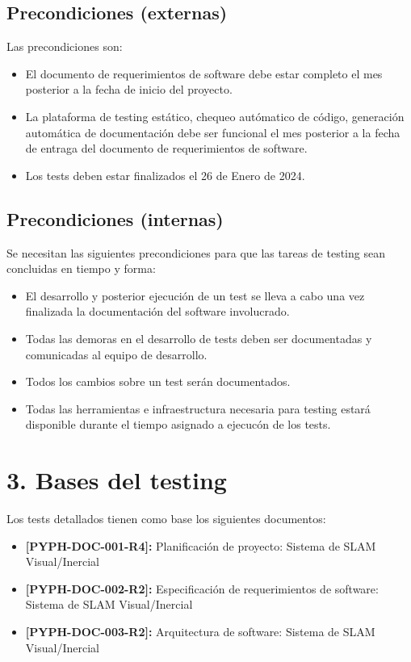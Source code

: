 \documentclass[
11pt, %
codirector, %
]{simple_charter}
\begin{document}
\subsection{Precondiciones (externas)}
\label{ssec:precondiciones-externas}

Las precondiciones son:

\begin{itemize}
	\item El documento de requerimientos de software debe estar completo el mes posterior a la fecha
	de inicio del proyecto.
	\item La plataforma de testing estático, chequeo autómatico de código, generación automática de
	documentación debe ser funcional el mes posterior a la fecha de entraga del documento de
	requerimientos de software.
	\item Los tests deben estar finalizados el 26 de Enero de 2024.
\end{itemize}

\subsection{Precondiciones (internas)}
\label{ssec:precondiciones-internas}

Se necesitan las siguientes precondiciones para que las tareas de testing sean concluidas en tiempo
y forma:

\begin{itemize}
	\item El desarrollo y posterior ejecución de un test se lleva a cabo una vez finalizada la
	documentación del software involucrado.
	\item Todas las demoras en el desarrollo de tests deben ser documentadas y comunicadas al equipo
	de desarrollo.
	\item  Todos los cambios sobre un test serán documentados.
	\item Todas las herramientas e infraestructura necesaria para testing estará disponible durante
	el tiempo asignado a ejecucón de los tests.
\end{itemize}

\section{3. Bases del testing}
\label{sec:3-bases-del-testing}

Los tests detallados tienen como base los siguientes documentos:

\begin{itemize}
	\item \textbf{[PYPH-DOC-001-R4]:} Planificación de proyecto: Sistema de SLAM Visual/Inercial
	\item \textbf{[PYPH-DOC-002-R2]:} Especificación de requerimientos de software: Sistema de SLAM
	Visual/Inercial
	\item \textbf{[PYPH-DOC-003-R2]:} Arquitectura de software: Sistema de SLAM Visual/Inercial
\end{itemize}
\end{document}
